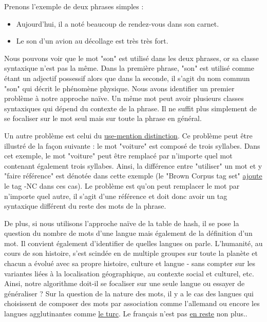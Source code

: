 \documentclass[french, 14pt]{memoir}
\begin{document}
Prenons l'exemple de deux phrases simples :
\begin{itemize}
    \item Aujourd'hui, il a noté beaucoup de rendez-vous dans son carnet.
    \item Le son d'un avion au décollage est très très fort.
\end{itemize}

Nous pouvons voir que le mot "son" est utilisé dans les deux phrases, or sa classe syntaxique n'est pas la même. Dans la première phrase, "son" est utilisé comme étant un adjectif possessif alors que dans la seconde, il s'agit du nom commun "son" qui décrit le phénomène physique. Nous avons identifier un premier problème à notre approche naïve. Un même mot peut avoir plusieurs classes syntaxiques qui dépend du contexte de la phrase. Il ne suffit plus simplement de se focaliser sur le mot seul mais sur toute la phrase en général.

Un autre problème est celui du \href{https://en.wikipedia.org/wiki/Use\%E2\%80\%93mention_distinction}{use-mention distinction}. Ce problème peut être illustré de la façon suivante : le mot "voiture" est composé de trois syllabes. Dans cet exemple, le mot "voiture" peut être remplacé par n'importe quel mot contenant également trois syllabes. Ainsi, la différence entre "utiliser" un mot et y "faire référence" est dénotée dans cette exemple (le "Brown Corpus tag set" \href{https://en.wikipedia.org/wiki/Part-of-speech_tagging#Issues}{ajoute} le tag -NC dans ces cas). Le problème est qu'on peut remplacer le mot par n'importe quel autre, il s'agit d'une référence et doit donc avoir un tag syntaxique différent du reste des mots de la phrase.

De plus, si nous utilisons l'approche naïve de la table de hash, il se pose la question du nombre de mots d'une langue mais également de la définition d'un mot. Il convient également d'identifier de quelles langues on parle. L'humanité, au cours de son histoire, s'est scindée en de multiple groupes sur toute la planète et chacun a évolué avec sa propre histoire, culture et langue - sans compter sur les variantes liées à la localisation géographique, au contexte social et culturel, etc. Ainsi, notre algorithme doit-il se focaliser sur une seule langue ou essayer de généraliser ? Sur la question de la nature des mots, il y a le cas des langues qui choisissent de composer des mots par association comme l'allemand ou encore les langues agglutinantes comme \href{https://en.wikipedia.org/wiki/Longest_word_in_Turkish}{le turc}. Le français n'est pas \href{https://en.wikipedia.org/wiki/Longest_word_in_French}{en reste} non plus..
\end{document}
